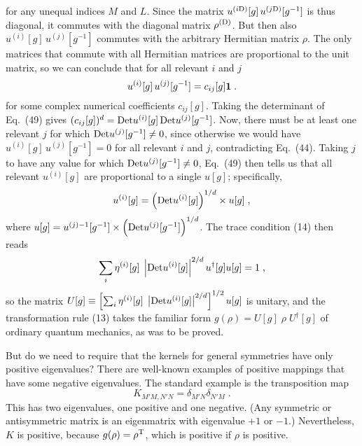 \documentclass[12pt]{article}
\def\BM#1{\mbox{\boldmath{$#1$}}}
\begin{document}
for any unequal indices $M$ and $L$.
Since the matrix $u^{(i{\rm D})}[g]\,u^{(j{\rm D})}[g^{-1}]$ is thus diagonal, it commutes with 
the diagonal matrix $\rho^{(\rm D)}$.  But then also $u^{(i)}[g]\,u^{(j)}[g^{-1}]$ commutes with the arbitrary Hermitian matrix $\rho$.  The only matrices that commute with all Hermitian matrices are proportional to the unit matrix, so we can conclude that for all relevant $i$ and $j$
\begin{equation}
u^{(i)}[g]\,u^{(j)}[g^{-1}]=c_{ij}[g]{\BM 1}\;.
\end{equation}
for some complex numerical coefficients $c_{ij}[g]$.  Taking the determinant of Eq.~(49) gives $(c_{ij}[g])^d={\rm Det}  
u^{(i)}[g]\,{\rm Det}u^{(j)}[g^{-1}]$.  Now, there must be at least one relevant $j$ for which ${\rm Det}u^{(j)}[g^{-1}] \neq 0$, since otherwise we would have $u^{(i)}[g]\,u^{(j)}[g^{-1}]=0$ for all relevant $i$ and $j$, contradicting Eq.~(44).  Taking $j$ to have any value for which ${\rm Det}u^{(j)}[g^{-1}] \neq 0$, Eq.~(49) then tells us that all relevant $u^{(i)}[g]$ are proportional to a single $u[g]$; specifically,
\begin{eqnarray}
u^{(i)}[g]=\Big({\rm Det} u^{(i)}[g]\Big)^{1/d}\times u[g]\;,
\end{eqnarray}
where $u[g]=u^{(j)-1}[g^{-1}]\times {\rm \Big(Det}u^{(j)}[g^{-1}]\Big)^{1/d}$.    The trace condition (14) then reads 
$$ \sum_i \eta^{(i)}[g]\;\left |{\rm Det} u^{(i)}[g]\right|^{2/d} u^\dagger[g]u[g]=1\;,$$
so the matrix  $U[g]\equiv \left[\sum_i \eta^{(i)}[g]\;\left |{\rm Det} u^{(i)}[g]\right|^{2/d}\right]^{1/2} u[g]$ is unitary, and the transformation rule (13) takes  the familiar form $g(\rho)=U[g]\;\rho\;U^{\dagger}[g]$ of ordinary quantum mechanics, as was to be proved.





But do we need to require that the kernels for general symmetries have only positive eigenvalues?  There are well-known examples of positive mappings that have some negative eigenvalues.  The standard example is the transposition map
$$K_{M'M,N'N}=\delta_{M'N}\delta_{N'M}\;.$$
This has two eigenvalues, one positive and one negative.  (Any symmetric or antisymmetric matrix is an eigenmatrix with eigenvalue $+1$ or $-1$.)  Nevertheless,  $K$ is positive, because $g(\rho)=\rho^{\rm T}$, which is positive if $\rho$ is positive.  
\end{document}
